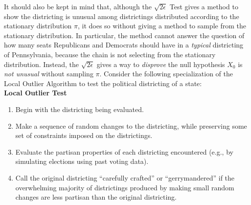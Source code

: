 \documentclass[12pt]{article}
\begin{document}
\begin{example}
It should also be kept in mind that, although the \( \sqrt{2\epsilon} \)
Test gives a method to show the districting is unusual among
districtings distributed according to the stationary distribution \( \pi
\), it does so without giving a method to sample from the stationary
distribution.  In particular, the method cannot answer the question of
how many seats Republicans and Democrats should have in a \emph{typical}
districting of Pennsylvania, because the chain is not selecting from the
stationary distribution.  Instead, the \( \sqrt{2\epsilon} \) gives a
way to \emph{disprove} the null hypothesis \( X_{0} \) is \emph{not
unusual} without sampling \( \pi \). Consider the following
specialization of the Local Outlier Algorithm to test the political
districting of a state:\\
\textbf{Local Outlier Test}%
\begin{enumerate}
    \item
        Begin with the districting being evaluated.
    \item
        \label{enum:serialsignificance:mcstep} Make a sequence of random
        changes to the districting, while preserving some set of
        constraints imposed on the districtings.
    \item
        Evaluate the partisan properties of each districting encountered
        (e.g., by simulating elections using past voting data).
    \item
        \label{enum:serialsignificance:crafted} Call the original
        districting ``carefully crafted'' or ``gerrymandered'' if the
        overwhelming majority of districtings produced by making small
        random changes are less partisan than the original districting.
\end{enumerate}


\end{example}
\end{document}
